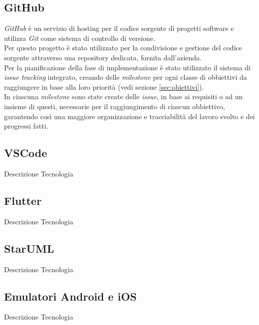 \subsection*{GitHub}
\emph{GitHub}\cite{site:github} è un servizio di hosting per il codice sorgente di progetti software e utilizza \emph{Git} come sistema di controllo di versione.\\
Per questo progetto è stato utilizzato per la condivisione e gestione del codice sorgente attraverso una repository dedicata, fornita dall'azienda.\\
Per la pianificazione della fase di implementazione è stato utilizzato il sistema di \emph{issue tracking} integrato, creando delle \emph{milestone} per ogni classe di obbiettivi da raggiungere in base alla loro priorità (vedi sezione \ref{sec:obiettivi}).\\
In ciascuna \emph{milestone} sono state create delle \emph{issue}, in base ai requisiti o ad un insieme di questi, necessarie per il raggiungimento di ciascun obbiettivo, garantendo così una maggiore organizzazione e tracciabilità del lavoro svolto e dei progressi fatti.\\

\subsection*{VSCode}
Descrizione Tecnologia

\subsection*{Flutter}
Descrizione Tecnologia

\subsection*{StarUML}
Descrizione Tecnologia

\subsection*{Emulatori Android e iOS}
Descrizione Tecnologia